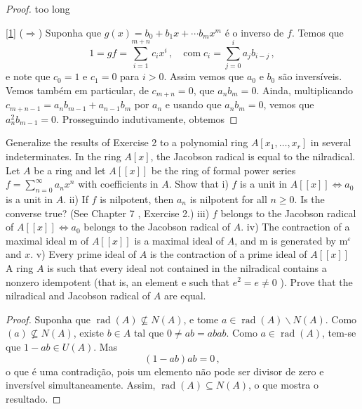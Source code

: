 \documentclass{article}
\newcommand{\rad}{\operatorname{rad}}
\begin{document}
	\begin{proof}
		too long
		
		\ref{1} ($\Rightarrow$) Suponha que $g(x) = b_0 + b_1x + \dotsb b_mx^m$ é o inverso de $f$. Temos que 
		\[
			1 = gf = \sum_{i=1}^{m+n}c_ix^i\,, \quad\text{com}\; c_i = \sum_{j=0}^{i}a_jb_{i-j}\,,
		\]
		e note que $c_0 = 1$ e $c_1 = 0$ para $i>0$. Assim vemos que $a_0$ e $b_0$ são inversíveis. Vemos também em particular, de $c_{m+n} = 0$, que $a_nb_m = 0$. Ainda, multiplicando $c_{m+n-1} = a_nb_{m-1} + a_{n-1}b_m$ por $a_n$ e usando que $a_nb_m = 0$, vemos que $a_n^2b_{m-1}=0$. Prosseguindo indutivamente, obtemos 
	\end{proof}
	
	\exercicio Generalize the results of Exercise 2 to a polynomial ring $A\left[x_{1}, \ldots, x_{r}\right]$ in several indeterminates.
	\exercicio In the ring $A[x]$, the Jacobson radical is equal to the nilradical.
	\exercicio Let $A$ be a ring and let $A[[x]]$ be the ring of formal power series $f=\sum_{n=0}^{\infty} a_{n} x^{n}$ with coefficients in $A$. Show that
	i) $f$ is a unit in $A[[x]] \Leftrightarrow a_{0}$ is a unit in $A$.
	ii) If $f$ is nilpotent, then $a_{n}$ is nilpotent for all $n \geqslant 0 .$ Is the converse true? (See Chapter 7 , Exercise 2.)
	iii) $f$ belongs to the Jacobson radical of $A[[x]] \Leftrightarrow a_{0}$ belongs to the Jacobson radical of $A .$
	iv) The contraction of a maximal ideal $\mathrm{m}$ of $A[[x]]$ is a maximal ideal of $A$, and $\mathrm{m}$ is generated by $\mathrm{m}^{\varepsilon}$ and $x .$
	v) Every prime ideal of $A$ is the contraction of a prime ideal of $A[[x]]$
	\exercicio A ring $A$ is such that every ideal not contained in the nilradical contains a nonzero idempotent (that is, an element e such that $e^{2}=e \neq 0$ ). Prove that the nilradical and Jacobson radical of $A$ are equal.
	
	\begin{proof}
		Suponha que $\rad(A)\not\subseteq N(A)$, e tome $a\in \rad(A)\backslash N(A)$. Como $(a)\not\subseteq N(A)$, existe $b\in A$ tal que $0\neq ab = abab$. Como $a\in \rad(A)$, tem-se que $1 - ab\in U(A)$. Mas
		\[
			(1-ab)ab = 0\,,
		\]
		o que é uma contradição, pois um elemento não pode ser divisor de zero e inversível simultaneamente. Assim, $\rad(A)\subseteq N(A)$, o que mostra o resultado.
	\end{proof}
\end{document}
